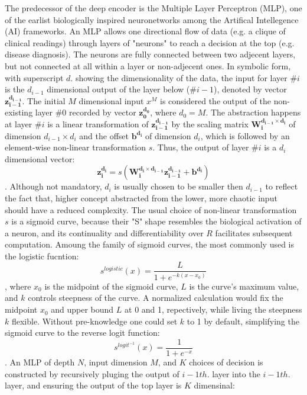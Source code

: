 \documentclass[twocolumn]{article}
\begin{document}
The predecessor of the deep encoder is the Multiple Layer Perceptron (MLP), one of the earlist biologically inspired neuronetworks among the Artifical Intellegence (AI) frameworks. An MLP allows one directional flow of data (e.g. a clique of clinical readings) through layers of "neurons" to reach a decision at the top (e.g. disease diagnosis). The neurons are fully connected between two adjecent layers, but not connected at all within a layer or non-adjecent ones. In symbolic form, with superscript $d.$ showing the dimensionality of the data, the input for layer $\#i$ is the $d_{i-1}$ dimensional output of the layer below ($\#i-1$), denoted by vector $\boldsymbol{z_{i-1}^{d_{i-1}}}$. The initial $M$ dimensional input $x^M$ is considered the output of the non-existing layer $\#0$ recorded by vector $\boldsymbol{z_0^{d_0}}$, where $d_0=M$. The abstraction happens at layer $\#i$ is a linear transformation of $\boldsymbol{z_{i-1}^{d_{i-1}}}$ by the scaling matrix $\boldsymbol{W_i^{d_{i-1}\times d_i}}$ of dimension $d_{i-1} \times d_i$ and the offset $\boldsymbol{b^{d_i}}$ of dimension $d_i$, which is followed by an element-wise non-linear transformation $s$. Thus, the output of layer $\#i$ is a $d_i$ dimensional vector:
\[ \boldsymbol{z_i^{d_i}} = s(\boldsymbol{W_i^{d_i\times d_{i-1}}z_{i-1}^{d_{i-1}}}+\boldsymbol{b^{d_i}})\].
Although not mandatory, $d_i$ is usually chosen to be smaller then $d_{i-1}$ to reflect the fact that, higher concept abstracted from the lower, more chaotic input should have a reduced complexity. 
The usual choice of non-linear transformation $s$ is a sigmoid curve, because their "S" shape resembles the biological activation of a neuron, and its continuality and differentiability over $R$ facilitates subsequent computation. Amoung the family of sigmoid curves, the most commonly used is the logistic fucntion: 
\[s^{logistic}(x)=\frac{L}{1+e^{-k(x-x_0)}}\],
where $x_0$ is the midpoint of the sigmoid curve, $L$ is the curve's maximum value, and $k$ controls steepness of the curve. A normalized calculation would fix the midpoint $x_0$ and upper bound $L$ at 0 and 1, repectively, while living the steepness $k$ flexible. Without pre-knowledge one could set $k$ to 1 by default, simplifying the sigmoid curve to the reverse logit function: 
\[s^{logit^{-1}}(x)=\frac{1}{1+e^{-x}}\].
An MLP of depth $N$, input dimension $M$, and $K$ choices of decision is constructed by recursively pluging the output of $i-1 th.$ layer into the $i-1 th.$ layer, and ensuring the output of the top layer is $K$ dimensinal:
\end{document}
